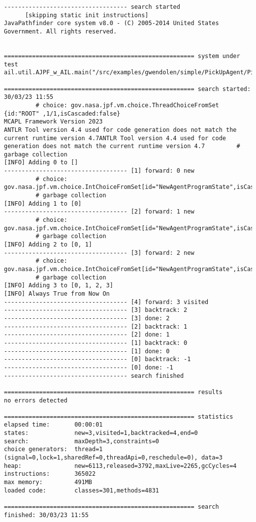 \noindent \begin{lstlisting}
----------------------------------- search started
      [skipping static init instructions]
JavaPathfinder core system v8.0 - (C) 2005-2014 United States Government. All rights reserved.


====================================================== system under test
ail.util.AJPF_w_AIL.main("/src/examples/gwendolen/simple/PickUpAgent/PickUpAgent.ail","/src/examples/gwendolen/simple/PickUpAgent/PickUpAgent.psl","0")

====================================================== search started: 30/03/23 11:55
		 # choice: gov.nasa.jpf.vm.choice.ThreadChoiceFromSet {id:"ROOT" ,1/1,isCascaded:false}
MCAPL Framework Version 2023
ANTLR Tool version 4.4 used for code generation does not match the current runtime version 4.7ANTLR Tool version 4.4 used for code generation does not match the current runtime version 4.7		 # garbage collection
[INFO] Adding 0 to []
----------------------------------- [1] forward: 0 new
		 # choice: gov.nasa.jpf.vm.choice.IntChoiceFromSet[id="NewAgentProgramState",isCascaded:false,>0]
		 # garbage collection
[INFO] Adding 1 to [0]
----------------------------------- [2] forward: 1 new
		 # choice: gov.nasa.jpf.vm.choice.IntChoiceFromSet[id="NewAgentProgramState",isCascaded:false,>0]
		 # garbage collection
[INFO] Adding 2 to [0, 1]
----------------------------------- [3] forward: 2 new
		 # choice: gov.nasa.jpf.vm.choice.IntChoiceFromSet[id="NewAgentProgramState",isCascaded:false,>0]
		 # garbage collection
[INFO] Adding 3 to [0, 1, 2, 3]
[INFO] Always True from Now On
----------------------------------- [4] forward: 3 visited
----------------------------------- [3] backtrack: 2
----------------------------------- [3] done: 2
----------------------------------- [2] backtrack: 1
----------------------------------- [2] done: 1
----------------------------------- [1] backtrack: 0
----------------------------------- [1] done: 0
----------------------------------- [0] backtrack: -1
----------------------------------- [0] done: -1
----------------------------------- search finished

====================================================== results
no errors detected

====================================================== statistics
elapsed time:       00:00:01
states:             new=3,visited=1,backtracked=4,end=0
search:             maxDepth=3,constraints=0
choice generators:  thread=1 (signal=0,lock=1,sharedRef=0,threadApi=0,reschedule=0), data=3
heap:               new=6113,released=3792,maxLive=2265,gcCycles=4
instructions:       365022
max memory:         491MB
loaded code:        classes=301,methods=4831

====================================================== search finished: 30/03/23 11:55
\end{lstlisting}

